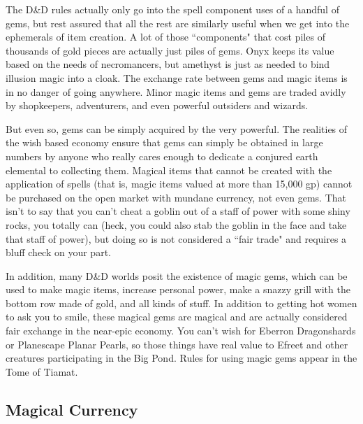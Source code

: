 The D\&D rules actually only go into the spell component uses of a handful of gems, but rest assured that all the rest are similarly useful when we get into the ephemerals of item creation. A lot of those ``components" that cost piles of thousands of gold pieces are actually just piles of gems. Onyx keeps its value based on the needs of necromancers, but amethyst is just as needed to bind illusion magic into a cloak. The exchange rate between gems and magic items is in no danger of going anywhere. Minor magic items and gems are traded avidly by shopkeepers, adventurers, and even powerful outsiders and wizards.

But even so, gems can be simply acquired by the very powerful. The realities of the wish based economy ensure that gems can simply be obtained in large numbers by anyone who really cares enough to dedicate a conjured earth elemental to collecting them. Magical items that cannot be created with the application of spells (that is, magic items valued at more than 15,000 gp) cannot be purchased on the open market with mundane currency, not even gems. That isn't to say that you can't cheat a goblin out of a staff of power with some shiny rocks, you totally can (heck, you could also stab the goblin in the face and take that staff of power), but doing so is not considered a ``fair trade" and requires a bluff check on your part.

In addition, many D\&D worlds posit the existence of magic gems, which can be used to make magic items, increase personal power, make a snazzy grill with the bottom row made of gold, and all kinds of stuff. In addition to getting hot women to ask you to smile, these magical gems are magical and are actually considered fair exchange in the near-epic economy. You can't wish for Eberron Dragonshards or Planescape Planar Pearls, so those things have real value to Efreet and other creatures participating in the Big Pond. Rules for using magic gems appear in the Tome of Tiamat.

\subsection{Magical Currency}

\listone



